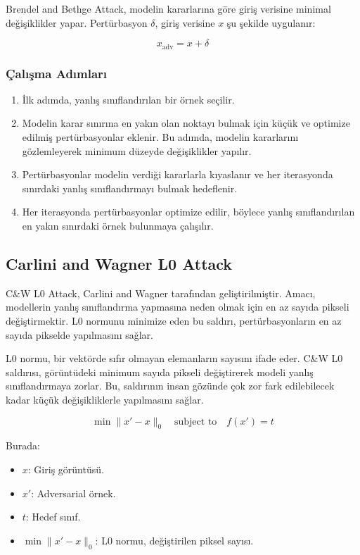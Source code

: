 Brendel and Bethge Attack, modelin kararlarına göre giriş verisine minimal değişiklikler yapar. Pertürbasyon $\delta$, giriş verisine $x$ şu şekilde uygulanır:

\[ x_{\text{adv}} = x + \delta \]

\subsubsection{Çalışma Adımları}

\begin{enumerate}
    \item İlk adımda, yanlış sınıflandırılan bir örnek seçilir.
    \item Modelin karar sınırına en yakın olan noktayı bulmak için küçük ve optimize edilmiş pertürbasyonlar eklenir. Bu adımda, modelin kararlarını gözlemleyerek minimum düzeyde değişiklikler yapılır.
    \item Pertürbasyonlar modelin verdiği kararlarla kıyaslanır ve her iterasyonda sınırdaki yanlış sınıflandırmayı bulmak hedeflenir.
    \item Her iterasyonda pertürbasyonlar optimize edilir, böylece yanlış sınıflandırılan en yakın sınırdaki örnek bulunmaya çalışılır.
\end{enumerate}

\newpage

\subsection{Carlini and Wagner L0 Attack}

C\&W L0 Attack, Carlini and Wagner tarafından geliştirilmiştir. Amacı, modellerin yanlış sınıflandırma yapmasına neden olmak için en az sayıda pikseli değiştirmektir. L0 normunu minimize eden bu saldırı, pertürbasyonların en az sayıda pikselde yapılmasını sağlar.

L0 normu, bir vektörde sıfır olmayan elemanların sayısını ifade eder. C\&W L0 saldırısı, görüntüdeki minimum sayıda pikseli değiştirerek modeli yanlış sınıflandırmaya zorlar. Bu, saldırının insan gözünde çok zor fark edilebilecek kadar küçük değişikliklerle yapılmasını sağlar.

\[ \min \|x' - x\|_0 \quad \text{subject to} \quad f(x') = t \]

Burada:

\begin{itemize}
    \item $x$: Giriş görüntüsü.
    \item $x'$: Adversarial örnek.
    \item $t$: Hedef sınıf.
    \item $\min \|x' - x\|_0$: L0 normu, değiştirilen piksel sayısı.
\end{itemize}

